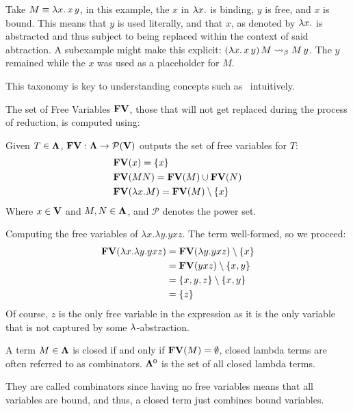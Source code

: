 \begin{example}
  Take $ M \equiv \lambda x . \, x \, y $, in this example, the $x$ in $\lambda x. $ is binding, $y$ is free, and $x$ is bound. This means that $y$ is used literally, and that $x$, as denoted by $\lambda x.$ is abstracted and thus subject to being replaced within the context of said abtraction. A subexample might make this explicit: $ (\lambda x . \, x \, y) \, M \mathrel{\leadsto}_\beta M \, y $. The $y$ remained while the $x$ was used as a placeholder for $M$.
\end{example}
\begin{remark}
  This taxonomy is key to understanding concepts such as \aequiv \ intuitively.
\end{remark}
The set of Free Variables $\mathbf{FV}$, those that will not get replaced during the process of reduction, is computed using:
\begin{definition} Given $T \in \mathbf{\Lambda} $, $\mathbf{FV} : \mathbf{\Lambda} \to \mathcal{P}(\mathbf{V}) $ outputs the set of free variables for $T$:
  \begin{align*}
    & \mathbf{FV}(x) = \{x\}\\
    & \mathbf{FV}(MN) = \mathbf{FV}(M) \cup \mathbf{FV}(N) \\
    & \mathbf{FV}(\lambda x . M) = \mathbf{FV}(M) \setminus \{x\}
  \end{align*}
  Where $ x \in \mathbf{V} $ and $ M, N \in \mathbf{\Lambda} $, and $\mathcal{P}$ denotes the power set.

\end{definition}
\begin{example} Computing the free variables of $\lambda x . \lambda y . y x z$. The term well-formed, so we proceed:
  \begin{align*}
    \mathbf{FV}(\lambda x . \lambda y . y x z) &= \mathbf{FV}(\lambda y . yxz) \setminus \{x\} \\
                                        &= \mathbf{FV}(yxz) \setminus \{x, y\} \\
                                        &= \{x, y, z\} \setminus \{x, y\} \\
                                        &= \{z\}
  \end{align*}
  Of course, $z$ is the only free variable in the expression as it is the only variable that is not captured by some $\lambda$-abstraction.
\end{example}
\begin{definition}
  A term $M \in \mathbf{\Lambda}$ is closed if and only if $\mathbf{FV}(M) = \emptyset$, closed lambda terms are often referred to as combinators. $\mathbf{\Lambda}^0$ is the set of all closed lambda terms.
\end{definition}
\begin{note} They are called combinators since having no free variables means that all variables are bound, and thus, a closed term just combines bound variables.
\end{note}

